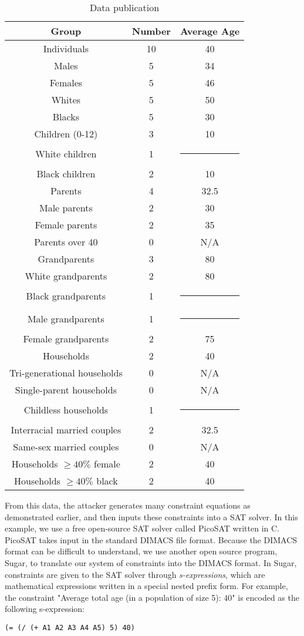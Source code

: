 \documentclass[5p,times,11pt]{elsarticle}
\begin{document}
\begin{table}[t]
\begin{tabular}{c|c|c}
Group & Number & Average Age \\
\hline
Individuals & 10 & 40 \\
Males & 5 & 34 \\
Females & 5 & 46 \\
Whites & 5 & 50 \\
Blacks & 5 & 30 \\
\hline
Children (0-12) & 3 & 10 \\
White children & 1 & \multicolumn{1}{c}{\rule{6mm}{3mm}} \\
Black children & 2 & 10 \\
\hline
Parents & 4 & 32.5 \\
Male parents & 2 & 30 \\
Female parents & 2 & 35 \\
Parents over 40 & 0 & N/A \\
\hline
Grandparents & 3 & 80 \\
White grandparents & 2 & 80 \\
Black grandparents & 1 & \multicolumn{1}{c}{\rule{6mm}{3mm}} \\
Male grandparents & 1 & \multicolumn{1}{c}{\rule{6mm}{3mm}} \\
Female grandparents & 2 & 75 \\
\hline
Households & 2 & 40 \\
Tri-generational households & 0 & N/A \\
Single-parent households & 0 & N/A \\
Childless households & 1 & \multicolumn{1}{c}{\rule{6mm}{3mm}} \\
Interracial married couples & 2 & 32.5 \\
Same-sex married couples & 0 & N/A \\
Households $\geq 40\% $ female & 2 & 40 \\
Households $\geq 40\% $ black & 2 & 40 \\

\hline
\end{tabular}
\caption{Data publication}\label{publishedstatsbig}
\end{table}

From this data, the attacker generates many constraint equations as demonstrated earlier,
and then inputs these constraints into a SAT solver. In this example, we use a free open-source SAT solver
called PicoSAT written in C. PicoSAT takes input in the standard DIMACS file format. Because the DIMACS format can be difficult to understand, we use another open source program, Sugar\cite{sugar}, to translate our system of constraints into the DIMACS format. In Sugar, constraints are given to the SAT solver through \textit{s-expressions}, which are mathematical expressions written in a special nested prefix form. For example, the constraint "Average total age (in a population of size 5): 40" is encoded as the following s-expression:
\begin{verbatim}
(= (/ (+ A1 A2 A3 A4 A5) 5) 40)
\end{verbatim}
\end{document}
